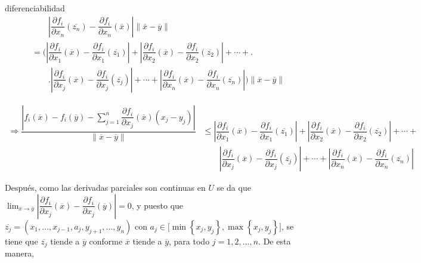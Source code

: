 \documentclass[fleqn, 12pt]{article}
\newenvironment{ejercicio}[1]{\begin{ejer}[breakable, pad at break = 5mm]{}{#1}}{\end{ejer}}
\begin{document}
\begin{ejercicio}{diferenciabilidad}
\begin{equation*}
\begin{split}
				& \qquad \left\lvert \dfrac{\partial f_i}{\partial x_n} (\overline{z_n}) - \dfrac{\partial f_i}{\partial x_n} (\overline{x}) \right\rvert \left\lVert \overline{x} - \overline{y} \right\rVert \\
				&= \Biggl( \left\lvert \dfrac{\partial f_i}{\partial x_1} (\overline{x}) - \dfrac{\partial f_i}{\partial x_1} (\overline{z_1}) \right\rvert + \left\lvert \dfrac{\partial f_i}{\partial x_2} (\overline{x}) - \dfrac{\partial f_i}{\partial x_2} (\overline{z_2}) \right\rvert + \cdots + \Biggr. \\
				& \qquad \Biggl. \left\lvert \dfrac{\partial f_i}{\partial x_j} (\overline{x}) - \dfrac{\partial f_i}{\partial x_j} (\overline{z_j}) \right\rvert + \cdots + \left\lvert \dfrac{\partial f_i}{\partial x_n} (\overline{x}) - \dfrac{\partial f_i}{\partial x_n} (\overline{z_n}) \right\rvert \Biggr) \left\lVert \overline{x} - \overline{y} \right\rVert
			\end{split}
		\end{equation*}

		\begin{equation*}
			\begin{split}
				\Longrightarrow \dfrac{\left\lvert f_i(\overline{x}) - f_i(\overline{y}) - \displaystyle \sum_{j=1}^{n} \dfrac{\partial f_i}{\partial x_j}(\overline{x}) \left( x_j - y_j \right) \right\rvert}{\left\lVert \overline{x} - \overline{y} \right\rVert} &\leq \left\lvert \dfrac{\partial f_i}{\partial x_1} (\overline{x}) - \dfrac{\partial f_i}{\partial x_1} (\overline{z_1}) \right\rvert + \left\lvert \dfrac{\partial f_i}{\partial x_2} (\overline{x}) - \dfrac{\partial f_i}{\partial x_2} (\overline{z_2}) \right\rvert + \cdots + \\
				& \qquad \left\lvert \dfrac{\partial f_i}{\partial x_j} (\overline{x}) - \dfrac{\partial f_i}{\partial x_j} (\overline{z_j}) \right\rvert + \cdots + \left\lvert \dfrac{\partial f_i}{\partial x_n} (\overline{x}) - \dfrac{\partial f_i}{\partial x_n} (\overline{z_n}) \right\rvert
			\end{split}
		\end{equation*}

		Después, como las derivadas parciales son continuas en $ U $ se da que $ \displaystyle \lim_{\overline{x} \to \overline{y}} \left\lvert \dfrac{\partial f_i}{\partial x_j} (\overline{x}) - \dfrac{\partial f_i}{\partial x_j} (\overline{y}) \right\rvert = 0 $, y puesto que $ \overline{z_j} = (x_1, \ldots, x_{j-1}, a_j, y_{j+1}, \ldots, y_n) $ con $ a_j \in \bigl[ \min \left\lbrace x_j, y_j \right\rbrace, \max \left\lbrace x_j, y_j \right\rbrace \bigr] $, se tiene que $ \overline{z_j} $ tiende a $ \overline{y} $ conforme $ \overline{x} $ tiende a $ \overline{y} $, para todo $ j = 1, 2, \ldots, n $. De esta manera, 


\end{ejercicio}
\end{document}
